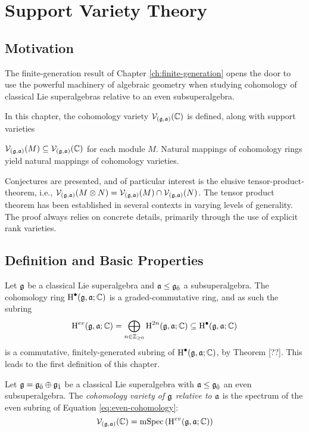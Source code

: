 \chapter{Support Variety Theory}
\label{ch:support}

\section{Motivation}
\label{sec:supp-motivation}

The finite-generation result of Chapter \ref{ch:finite-generation} opens the door to use the powerful machinery of algebraic geometry when studying cohomology of classical Lie superalgebras relative to an even subsuperalgebra.

In this chapter, the cohomology variety $\mathcal{V}_{(\mathfrak{g},\mathfrak{a})}(\mathbb{C})$ is defined, along with support varieties

$\mathcal{V}_{(\mathfrak{g},\mathfrak{a})}(M) \subseteq \mathcal{V}_{(\mathfrak{g},\mathfrak{a})}(\mathbb{C})$ for each module $M$. Natural mappings of cohomology rings yield natural mappings of cohomology varieties.

Conjectures are presented, and of particular interest is the elusive tensor-product-theorem, i.e., $\mathcal{V}_{(\mathfrak{g},\mathfrak{a})}(M \otimes N) = \mathcal{V}_{(\mathfrak{g},\mathfrak{a})}(M) \cap \mathcal{V}_{(\mathfrak{g},\mathfrak{a})}(N)$. The tensor product theorem has been established in several contexts in varying levels of generality. The proof always relies on concrete details, primarily through the use of explicit rank varieties. 

\section{Definition and Basic Properties}
\label{sec:def-sv}

Let $\mathfrak{g}$ be a classical Lie superalgebra and $\mathfrak{a} \leq {\mathfrak{g}}_{\bar{0}}$ a subsuperalgebra. The cohomology ring $\operatorname{H}^\bullet(\mathfrak{g},\mathfrak{a};\mathbb{C})$ is a graded-commutative ring, and as such the subring
\begin{equation} \label{eq:even-cohomology}
  \operatorname{H}^{ev}(\mathfrak{g},\mathfrak{a};\mathbb{C}) = \bigoplus_{n \in \mathbb{Z}_{\geq 0}} \operatorname{H}^{2n}(\mathfrak{g},\mathfrak{a};\mathbb{C}) \subseteq \operatorname{H}^\bullet(\mathfrak{g},\mathfrak{a};\mathbb{C})
\end{equation}
is a commutative, finitely-generated subring of $\operatorname{H}^\bullet(\mathfrak{g},\mathfrak{a};\mathbb{C})$, by Theorem [??]. This leads to the first definition of this chapter.


\begin{definition}
  Let $\mathfrak{g} = {\mathfrak{g}}_{\bar{0}} \oplus {\mathfrak{g}}_{\bar{1}}$ be a classical Lie superalgebra with $\mathfrak{a} \leq {\mathfrak{g}}_{\bar{0}}$ an even subsuperalgebra. The \emph{cohomology variety of $\mathfrak{g}$ relative to $\mathfrak{a}$} is the spectrum of the even subring of Equation \ref{eq:even-cohomology}:
  \[
    \mathcal{V}_{(\mathfrak{g},\mathfrak{a})}(\mathbb{C}) = \operatorname{mSpec}\left( \operatorname{H}^{ev}(\mathfrak{g},\mathfrak{a};\mathbb{C})\right)
  \]
\end{definition}

